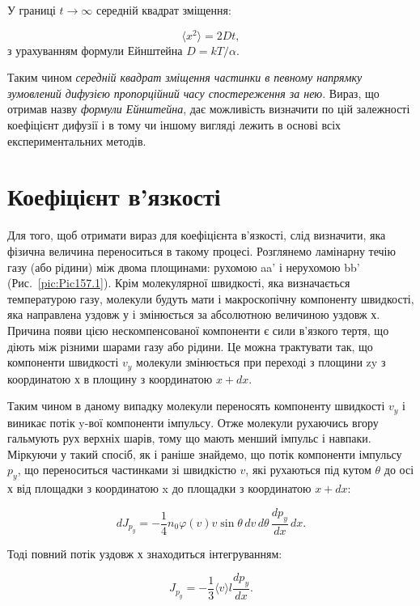 У границі $t \to \infty$ середній квадрат зміщення:

\begin{equation}
	\langle x^2 \rangle = 2 D t,
	\label{eq:155.11}
\end{equation}
%
з урахуванням формули Ейнштейна $D = kT/\alpha$.

Таким чином \emph{середній квадрат зміщення частинки в певному напрямку зумовлений дифузією пропорційний часу спостереження за нею}. Вираз, що отримав назву \emph{формули Ейнштейна}, дає можливість визначити по цій залежності коефіцієнт дифузії і в тому чи іншому вигляді лежить в основі всіх експериментальних методів.

\section{Коефіцієнт в’язкості}

Для того, щоб отримати вираз для коефіцієнта в’язкості, слід визначити, яка
фізична величина переноситься в такому процесі. Розглянемо ламінарну течію газу
(або рідини) між двома площинами: рухомою aa' і нерухомою bb' (Рис.~\ref{pic:Pic157.1}).
Крім молекулярної швидкості, яка визначається температурою газу, молекули
будуть мати і макроскопічну компоненту швидкості, яка направлена уздовж у і
змінюється за абсолютною величиною уздовж х. Причина появи цією
нескомпенсованої компоненти є сили в’язкого тертя, що діють між різними шарами
газу або рідини. Це можна трактувати так, що компоненти швидкості $v_y$
молекули змінюється при переході з площини zy з координатою х в площину
з координатою $x+dx$.

Таким чином в даному випадку молекули переносять компоненту швидкості $v_y$
і виникає потік y-вої компоненти імпульсу. Отже молекули рухаючись вгору
гальмують рух верхніх шарів, тому що мають менший імпульс і навпаки.
Міркуючи у такий спосіб, як і раніше знайдемо, що потік компоненти імпульсу
$p_y$, що переноситься частинками зі швидкістю $v$, які рухаються під кутом
$\theta$ до осі х від площадки з координатою x до площадки з координатою
$x+dx$:

\begin{equation}
	dJ_{p_y} = -\frac{1}{4} n_0 \varphi(v) v \sin\theta \, dv \, d\theta \,
	\frac{dp_y}{dx} \, dx .
	\label{eq:157.1}
\end{equation}

Тоді повний потік уздовж х знаходиться інтегруванням:

\begin{equation}
	J_{p_y} = -\frac{1}{3} \langle v \rangle l \frac{dp_y}{dx}.
	\label{eq:157.2}
\end{equation}


